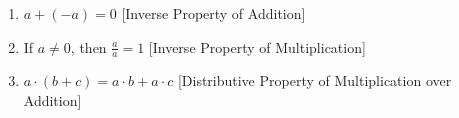 \documentclass[crop=false,class=book,oneside]{standalone}                      %
\begin{document}
\begin{properties}
\begin{enumerate}
{                            north_shore_arithmetic_properties_%
                            mult_identity%
                        }
                        ${a}\cdot{1}=a$\hfill
                        [Identity Property of Multiplication]
                    \item
                        \label{%
                            property:%
                            north_shore_arithmetic_properties_%
                            add_inverse%
                        }
                        $a+(-a)=0$\hfill
                        [Inverse Property of Addition]
                    \item
                        \label{%
                            property:%
                            north_shore_arithmetic_properties_%
                            mult_inverse%
                        }
                        If ${a}\ne{0}$, then $\frac{a}{a}=1$\hfill
                        [Inverse Property of Multiplication]
                    \item
                        \label{%
                            property:%
                            north_shore_arithmetic_properties_%
                            distributive_property%
                        }
                        ${a}\cdot{(b+c)}%
                         ={a}\cdot{b}+{a}\cdot{c}$\hfill
                        [Distributive Property of
                         Multiplication over Addition]
                \end{enumerate}
            \end{properties}
\end{document}
